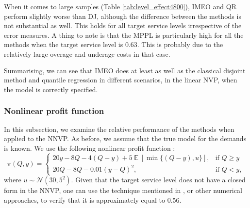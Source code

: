 \documentclass[a4paper,11pt]{article}
\DeclareMathOperator{\E}{\mathbb{E}}
\begin{document}
\begin{table}[htb]
\caption{Target service level effect with $s=4800$}
\label{tab:level_effect4800}
\centering
{}
\end{table}

When it comes to large samples (Table \ref{tab:level_effect4800}), IMEO and QR perform slightly worse than DJ, although the difference between the methods is not substantial as well. This holds for all target service levels irrespective of the error measures. A thing to note is that the MPPL is particularly high for all the methods when the target service level is 0.63. This is probably due to the relatively large overage and underage costs in that case.

Summarising, we can see that IMEO does at least as well as the classical disjoint method and quantile regression in different scenarios, in the linear NVP, when the model is correctly specified.


\subsubsection{Nonlinear profit function} \label{sub:exp2}

In this subsection, we examine the relative performance of the methods when applied to the NNVP. As before, we assume that the true model for the demands is known. We use the following nonlinear profit function \cite{KK18}:
\[
    \pi(Q,y)=
    \begin{cases}
        20y-8Q-4(Q-y)+5\E[\min \{(Q-y),u\}],& \text{if } Q\geq y\\
        20Q-8Q-0.01(y-Q)^2,& \text{if } Q< y,
    \end{cases}
\]
where $u\sim \mathcal{N}(30,5^2)$. Given that the target service level does not have a closed form in the NNVP, one can use the technique mentioned in \cite{KK18}, or other numerical approaches, to verify that it is approximately equal to 0.56.
\end{document}
